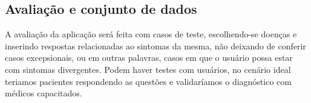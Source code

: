 \subsection{Avaliação e conjunto de dados}

A avaliação da aplicação será feita com casos de teste, escolhendo-se doenças e inserindo respostas relacionadas ao sintomas da mesma, não deixando de conferir casos excepsionais, ou  em outras palavras, casos em que o usuário possa estar com sintomas divergentes.
Podem haver testes com usuários, no cenário ideal teriamos pacientes respondendo as questões e validaríamos o diagnóstico com médicos capacitados.

